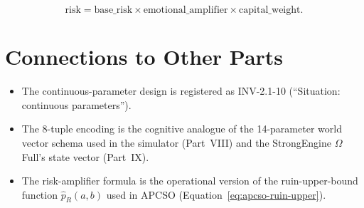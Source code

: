 \begin{equation}
\mathrm{risk} = \mathrm{base\_risk} \times
\mathrm{emotional\_amplifier} \times
\mathrm{capital\_weight}.
\label{eq:situation-risk}
\end{equation}


\section*{Connections to Other Parts}

\begin{itemize}
\item The continuous-parameter design is registered as INV-2.1-10
(``Situation: continuous parameters'').
\item The 8-tuple encoding is the cognitive analogue of the
14-parameter world vector schema used in the simulator (Part~VIII)
and the StrongEngine $\Omega$ Full's state vector (Part~IX).
\item The risk-amplifier formula is the operational version of the
ruin-upper-bound function $\widehat{p}_R(a, b)$ used in APCSO
(Equation~\ref{eq:apcso-ruin-upper}).
\end{itemize}

